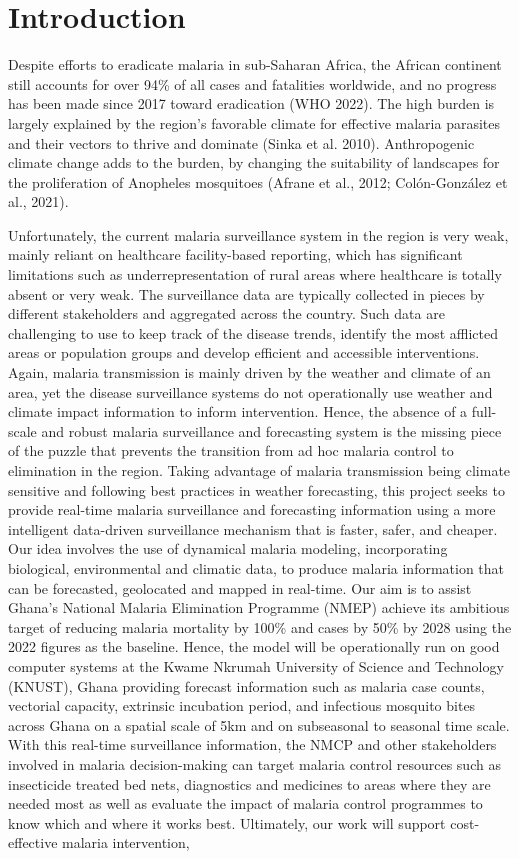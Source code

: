 \documentclass[utf8]{FrontiersinHarvard} %
\begin{document}
\section{Introduction}

Despite efforts to eradicate malaria in sub-Saharan Africa, the African continent still accounts for over 94\% of all cases and fatalities worldwide, and no progress has been made since 2017 toward eradication (WHO 2022). The high burden is largely explained by the region's favorable climate for effective malaria parasites and their vectors to thrive and dominate (Sinka et al. 2010). Anthropogenic climate change adds to the burden, by changing the suitability of landscapes for the proliferation of Anopheles mosquitoes (Afrane et al., 2012; Colón-González et al., 2021). 


Unfortunately, the current malaria surveillance system in the region is very weak, mainly reliant on healthcare facility-based reporting, which has significant limitations such as underrepresentation of rural areas where healthcare is totally absent or very weak. The surveillance data are typically collected in pieces by different stakeholders and aggregated across the country. Such data are challenging to use to keep track of the disease trends, identify the most afflicted areas or population groups and develop efficient and accessible interventions. Again, malaria transmission is mainly driven by the weather and climate of an area, yet the disease surveillance systems do not operationally use weather and climate impact information to inform intervention. Hence, the absence of a full-scale and robust malaria surveillance and forecasting system is the missing piece of the puzzle that prevents the transition from ad hoc malaria control to elimination in the region. Taking advantage of malaria transmission being climate sensitive and following best practices in weather forecasting, this project seeks to provide real-time malaria surveillance and forecasting information using a more intelligent data-driven surveillance mechanism that is faster, safer, and cheaper. Our idea involves the use of dynamical malaria modeling, incorporating biological, environmental and climatic data, to produce malaria information that can be forecasted, geolocated and mapped in real-time. Our aim is to assist Ghana’s National Malaria Elimination Programme (NMEP) achieve its ambitious target of reducing malaria mortality by 100\% and cases by 50\% by 2028 using the 2022 figures as the baseline. Hence, the model will be operationally run on good computer systems at the Kwame Nkrumah University of Science and Technology (KNUST), Ghana providing forecast information such as malaria case counts, vectorial capacity, extrinsic incubation period,  and infectious mosquito bites across Ghana on a spatial scale of 5km and on subseasonal to seasonal time scale. With this real-time surveillance information, the NMCP and other stakeholders involved in malaria decision-making can target malaria control resources such as insecticide treated bed nets, diagnostics and medicines to areas where they are needed most as well as evaluate the impact of malaria control programmes to know which and where it works best. Ultimately, our work will support cost-effective malaria intervention, 
\end{document}
